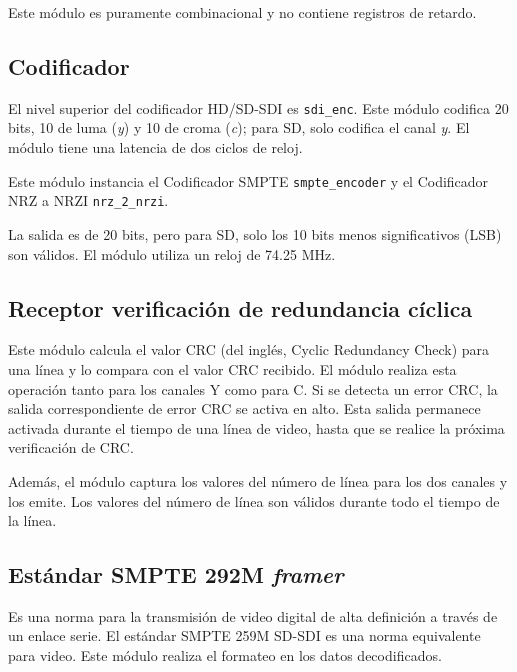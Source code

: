 Este módulo es puramente combinacional y no contiene registros de retardo.

\subsection{Codificador}

  El nivel superior del codificador HD/SD-SDI es \texttt{sdi\_enc}. Este módulo
  codifica 20 bits, 10 de luma (\textit{y}) y 10 de croma (\textit{c}); para SD,
  solo codifica el canal \textit{y}. El módulo tiene una latencia de dos ciclos
  de reloj.

  Este módulo instancia el Codificador SMPTE \texttt{smpte\_encoder} y el
  Codificador NRZ a NRZI \texttt{nrz\_2\_nrzi}.

  La salida es de 20 bits, pero para SD, solo los 10 bits menos significativos
  (LSB) son válidos. El módulo utiliza un reloj de 74.25 MHz.

\subsection{Receptor verificación de redundancia cíclica}

  Este módulo calcula el valor CRC (del inglés, Cyclic Redundancy Check) para una línea y lo compara con el valor CRC
  recibido. El módulo realiza esta operación tanto para los canales Y como para C.
  Si se detecta un error CRC, la salida correspondiente de error CRC se activa en
  alto. Esta salida permanece activada durante el tiempo de una línea de video,
  hasta que se realice la próxima verificación de CRC\@.

  Además, el módulo captura los valores del número de línea para los dos canales
  y los emite. Los valores del número de línea son válidos durante todo el tiempo
  de la línea.

\subsection{Estándar SMPTE 292M \textit{framer}}

Es una norma para la transmisión de video digital de alta definición a través
de un enlace serie. El estándar SMPTE 259M SD-SDI es una norma equivalente
para video. Este módulo realiza el formateo en los datos decodificados.

